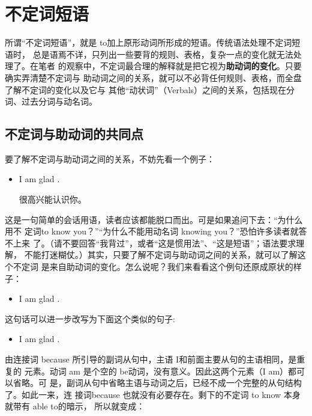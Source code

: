 \chapter{不定词短语}

所谓“不定词短语”，就是 to加上原形动词所形成的短语。传统语法处理不定词短语时，
总是语焉不详，只列出一些要背的规则、表格，复杂一点的变化就无法处理了。在笔者
的观察中，不定词最合理的解释就是把它视为\textbf{助动词的变化}。只要确实弄清楚不定词与
助动词之间的关系，就可以不必背任何规则、表格，而全盘了解不定词的变化以及它与
其他“动状词”（Verbals）之间的关系，包括现在分词、过去分词与动名词。

\section{不定词与助动词的共同点}

要了解不定词与助动词之间的关系，不妨先看一个例子：

\begin{itemize}
\item  I am glad .

  很高兴能认识你。
\end{itemize}

这是一句简单的会话用语，读者应该都能脱口而出。可是如果追问下去：“为什么用不
定词to know you？”“为什么不能用动名词 knowing you？”恐怕许多读者就答不上来
了。（请不要回答“我背过”，或者“这是惯用法”、“这是短语”；语法要求理解，
不能打迷糊仗。）其实，只要了解不定词与助动词之间的关系，就可以了解这个不定词
是来自助动词的变化。怎么说呢？我们来看看这个例句还原成原状的样子：

\begin{itemize}
\item  I am glad .
\end{itemize}

这句话可以进一步改写为下面这个类似的句子:

\begin{itemize}
\item  I am glad .
\end{itemize}

由连接词 because 所引导的副词从句中，主语 I和前面主要从句的主语相同，是重复的
元素。动词 am 是个空的 be动词，没有意义。因此这两个元素（I am）都可以省略。可
是，副词从句中省略主语与动词之后，已经不成一个完整的从句结构了。如此一来，连
接词because 也就没有必要存在。剩下的不定词 to know 本身就带有 able to的暗示，
所以就变成：


